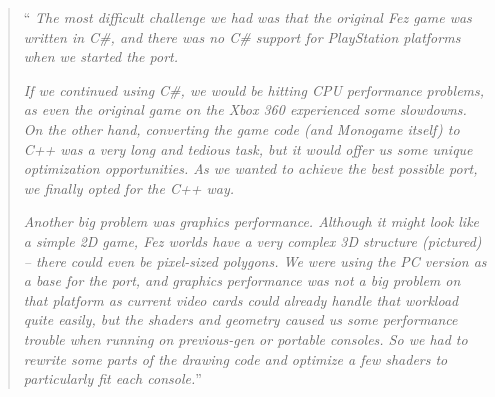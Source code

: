 \begin{quotation}
  ``\textit{
    The most difficult challenge we had was that the original Fez game was written in C\#, and there was no C\# support for PlayStation platforms when we started the port.}

    \textit{If we continued using C\#, we would be hitting CPU performance problems, as even the original game on the Xbox 360 experienced some slowdowns. On the other hand, converting the game code (and Monogame itself) to C++ was a very long and tedious task, but it would offer us some unique optimization opportunities. As we wanted to achieve the best possible port, we finally opted for the C++ way.}

    \textit{Another big problem was graphics performance. Although it might look like a simple 2D game, Fez worlds have a very complex 3D structure (pictured) -- there could even be pixel-sized polygons. We were using the PC version as a base for the port, and graphics performance was not a big problem on that platform as current video cards could already handle that workload quite easily, but the shaders and geometry caused us some performance trouble when running on previous-gen or portable consoles. So we had to rewrite some parts of the drawing code and optimize a few shaders to particularly fit each console.}''
    \cite{wawro}
\end{quotation}